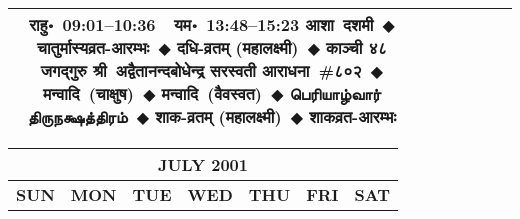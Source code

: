 \documentclass[a3paper,12pt,landscape]{article}
\newcommand{\eventsep}{~$\Diamondblack$ }
\newcommand{\tamil}[1]{%
{\fontspec[Scale=0.9,FakeStretch=0.9]{Noto Sans Tamil} \footnotesize #1}}
\newcommand{\rahuyama}[2]{%
{राहु॰~\textsf{#1}~~यम॰~\textsf{#2}}
}
\begin{document}
\begin{center}
\begin{tabular}{|c|c|c|c|c|c|c|}
{\rahuyama{09:01--10:36}{13:48--15:23}}%
{आशा~दशमी\eventsep चातुर्मास्यव्रत-आरम्भः\eventsep दधि-व्रतम् (महालक्ष्मी)\eventsep काञ्ची ४८ जगद्गुरु श्री~अद्वैतानन्दबोधेन्द्र सरस्वती आराधना~\#{८०२}\eventsep मन्वादि~(चाक्षुष)\eventsep मन्वादि~(वैवस्वत)\eventsep \tamil{பெரியாழ்வார் திருநக்ஷத்திரம்}\eventsep शाक-व्रतम् (महालक्ष्मी)\eventsep शाकव्रत-आरम्भः}
\\ \hline %
\end{tabular}



\begin{tabular}{|c|c|c|c|c|c|c|}
\multicolumn{7}{c}{\Large \bfseries \sffamily JULY 2001}\\[3mm]
\hline
\textbf{\textsf{SUN}} & \textbf{\textsf{MON}} & \textbf{\textsf{TUE}} & \textbf{\textsf{WED}} & \textbf{\textsf{THU}} & \textbf{\textsf{FRI}} & \textbf{\textsf{SAT}} \\ \hline


\end{tabular}
\end{center}
\end{document}
